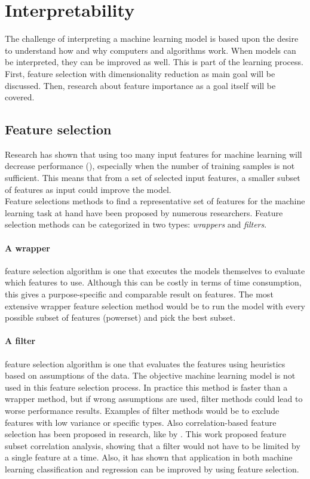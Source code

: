 \section{Interpretability}
The challenge of interpreting a machine learning model is based upon the desire to understand how and why computers and algorithms work. When models can be interpreted, they can be improved as well. This is part of the learning process. First, feature selection with dimensionality reduction as main goal will be discussed. Then, research about feature importance as a goal itself will be covered.

\subsection{Feature selection}
Research has shown that using too many input features for machine learning will decrease performance (\cite{Trunk1979-sq}), especially when the number of training samples is not sufficient. This means that from a set of selected input features, a smaller subset of features as input could improve the model. 
\\Feature selections methods to find a representative set of features for the machine learning task at hand have been proposed by numerous researchers. Feature selection methods can be categorized in two types: \textit{wrappers} and \textit{filters}. 
\paragraph{A wrapper} feature selection algorithm is one that executes the models themselves to evaluate which features to use. Although this can be costly in terms of time consumption, this gives a purpose-specific and comparable result on features. The most extensive wrapper feature selection method would be to run the model with every possible subset of features (powerset) and pick the best subset.

\paragraph{A filter} feature selection algorithm is one that evaluates the features using heuristics based on assumptions of the data. The objective machine learning model is not used in this feature selection process. In practice this method is faster than a wrapper method, but if wrong assumptions are used, filter methods could lead to worse performance results. Examples of filter methods would be to exclude features with low variance or specific types. Also correlation-based feature selection has been proposed in research, like by \cite{Hall2000-bx}. This work proposed feature subset correlation analysis, showing that a filter would not have to be limited by a single feature at a time. Also, it has shown that application in both machine learning classification and regression can be improved by using feature selection.

